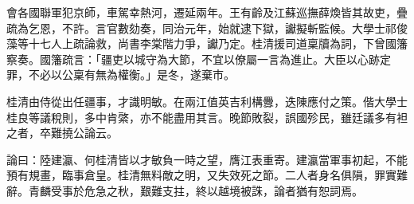 \begin{pinyinscope}
會各國聯軍犯京師，車駕幸熱河，遷延兩年。王有齡及江蘇巡撫薛煥皆其故吏，疊疏為乞恩，不許。言官數劾奏，同治元年，始就逮下獄，讞擬斬監候。大學士祁俊藻等十七人上疏論救，尚書李棠階力爭，讞乃定。桂清援司道稟牘為詞，下曾國籓察奏。國籓疏言：「疆吏以城守為大節，不宜以僚屬一言為進止。大臣以心跡定罪，不必以公稟有無為權衡。」是冬，遂棄市。

桂清由侍從出任疆事，才識明敏。在兩江值英吉利構釁，迭陳應付之策。偕大學士桂良等議稅則，多中肯綮，亦不能盡用其言。晚節敗裂，誤國殄民，雖廷議多有袒之者，卒難撓公論云。

論曰：陸建瀛、何桂清皆以才敏負一時之望，膺江表重寄。建瀛當軍事初起，不能預有規畫，臨事倉皇。桂清無料敵之明，又失效死之節。二人者身名俱隕，罪實難辭。青麟受事於危急之秋，艱難支拄，終以越境被誅，論者猶有恕詞焉。


\end{pinyinscope}